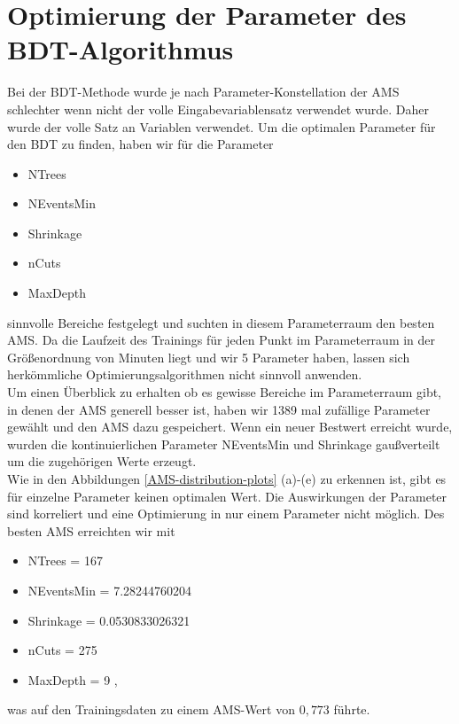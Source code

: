 \section{Optimierung der Parameter des BDT-Algorithmus}
\label{sec:bdt_optimization}
Bei der BDT-Methode wurde je nach Parameter-Konstellation der AMS schlechter wenn nicht der volle Eingabevariablensatz verwendet wurde. Daher wurde der volle Satz an Variablen verwendet. Um die optimalen Parameter für den BDT zu finden, haben wir für die Parameter
\begin{itemize}
	\item NTrees
	\item NEventsMin
	\item Shrinkage
	\item nCuts
	\item MaxDepth
\end{itemize} 
sinnvolle Bereiche festgelegt und suchten in diesem Parameterraum den besten AMS. Da die Laufzeit des Trainings für jeden Punkt im Parameterraum in der Größenordnung von Minuten liegt und wir 5 Parameter haben, lassen sich herkömmliche Optimierungsalgorithmen nicht sinnvoll anwenden.\\
Um einen Überblick zu erhalten ob es gewisse Bereiche im Parameterraum gibt, in denen der AMS generell besser ist, haben wir 1389 mal zufällige Parameter gewählt und den AMS dazu gespeichert. Wenn ein neuer Bestwert erreicht wurde, wurden die kontinuierlichen Parameter NEventsMin und Shrinkage gaußverteilt um die zugehörigen Werte erzeugt.\\
Wie in den Abbildungen \ref{AMS-distribution-plots} (a)-(e) zu erkennen ist, gibt es für einzelne Parameter keinen optimalen Wert. Die Auswirkungen der Parameter sind korreliert und eine Optimierung in nur einem Parameter nicht möglich. Des besten AMS erreichten wir mit
\begin{itemize}
	\item NTrees = 167
	\item NEventsMin = 7.28244760204
	\item Shrinkage = 0.0530833026321
	\item nCuts = 275
	\item MaxDepth  = 9  ,
\end{itemize} 
was auf den Trainingsdaten zu einem AMS-Wert von $0{,}773$ führte.

